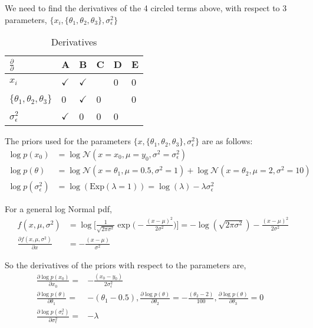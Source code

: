 \documentclass[a4paper,11pt]{article}
\begin{document}
We need to find the derivatives of the 4 circled terms above, with respect to 3 parameters, $\{ x_i, \{ \theta_1, \theta_2, \theta_3 \}, \sigma^2_{\epsilon} \}$

\begin{table}[H]
\centering
\caption{Derivatives}
\label{allderivs}
\begin{tabular}{|l|l|l|l|l|l|}
\hline
$\frac{\partial}{\partial}$ & $\mathbf{A}$ & $\mathbf{B}$ & $\mathbf{C}$ & $\mathbf{D}$ & $\mathbf{E}$ \\ \hline
$x_i$ & $\checkmark$ & $\checkmark$ & & 0 & 0 \\ \hline
$\{ \theta_1, \theta_2, \theta_3 \}$ & 0 & $\checkmark$ & 0 & & 0 \\ \hline
$\sigma^2_{\epsilon}$ & $\checkmark$ & 0 & 0 & 0 & \\ \hline
\end{tabular}
\end{table}

The priors used for the parameters $\{ x, \{ \theta_1, \theta_2, \theta_3 \}, \sigma^2_{\epsilon} \}$ are as follows:
\begin{align*}
\log p(x_0) & = \log \mathcal{N}(x = x_0, \mu = y_0, \sigma^2 = \sigma^2_{\epsilon})\\
\log p(\theta) & = \log \mathcal{N}(x = \theta_1, \mu = 0.5, \sigma^2 = 1) + \log \mathcal{N}(x = \theta_2, \mu = 2, \sigma^2 = 10)\\
\log p(\sigma^2_{\epsilon}) & = \log (\text{Exp}(\lambda = 1)) = \log (\lambda) -\lambda \sigma^2_{\epsilon}
\end{align*}

For a general log Normal pdf,
\begin{align*}
f(x, \mu, \sigma^2) & = \log \bigg[ \frac{1}{\sqrt{2 \pi \sigma^2}} \exp \bigg( - \frac{(x - \mu)^2}{2 \sigma^2} \bigg) \bigg] = - \log(\sqrt{2 \pi \sigma^2}) - \frac{(x - \mu)^2}{2 \sigma^2} \\
\frac{\partial f(x, \mu, \sigma^2)}{\partial x} & = - \frac{(x - \mu)}{\sigma^2}
\end{align*}

So the derivatives of the priors with respect to the parameters are,
\begin{align*}
\frac{\partial \log p(x_0)}{\partial x_0} = & - \frac{(x_0 - y_0)}{2 \sigma^2_{\epsilon}} \\
\frac{\partial \log p(\theta)}{\partial \theta_1} = & -(\theta_1 - 0.5), \frac{\partial \log p(\theta)}{\partial \theta_2} = -\frac{(\theta_2 -2)}{100}, \frac{\partial \log p(\theta)}{\partial \theta_3} = 0\\
\frac{\partial \log p(\sigma^2_{\epsilon})}{\partial \sigma_{\epsilon}^2} = & -\lambda &
\end{align*}
\end{document}
